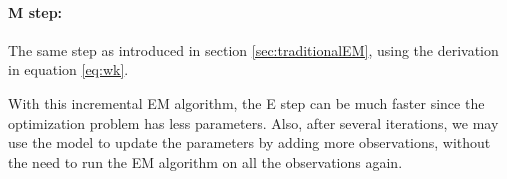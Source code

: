 \paragraph{M step:} The same step as introduced in section \ref{sec:traditionalEM}, using the derivation in equation \ref{eq:wk}.

With this incremental EM algorithm, the E step can be much faster since the optimization problem has less parameters. Also, after several iterations, we may use the model to update the parameters by adding more observations, without the need to run the EM algorithm on all the observations again.
